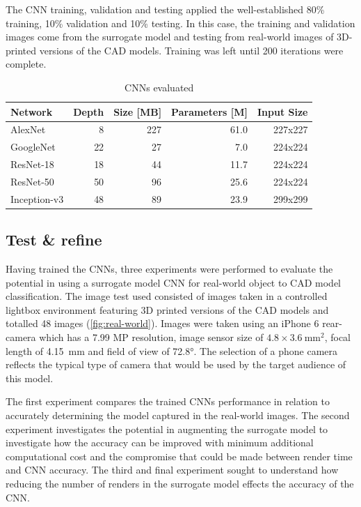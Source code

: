 \documentclass[a4paper, 11pt]{article}
\begin{document}
The CNN training, validation and testing applied the well-established 80\% training, 10\% validation and 10\% testing.
In this case, the training and validation images come from the surrogate model and testing from real-world images of 3D-printed versions of the CAD models.
Training was left until 200 iterations were complete.

\begin{table}
    \centering
    \caption{CNNs evaluated}\small
    \begin{tabular}{l r r r r}
    \toprule
        Network & Depth & Size [MB] & Parameters [M] & Input Size \\
    \midrule
        AlexNet \parencite{alexnet} & 8 & 227 & 61.0 & 227x227 \\
        GoogleNet \parencite{googlenet} & 22 & 27 & 7.0 & 224x224 \\
        ResNet-18 \parencite{resnet} & 18 & 44 & 11.7 & 224x224 \\
        ResNet-50 \parencite{resnet} & 50 & 96 & 25.6 & 224x224 \\
        Inception-v3 \parencite{inception} & 48 & 89 & 23.9 & 299x299 \\
    \bottomrule
    \end{tabular}
\end{table}


\subsection{Test \& refine}\label{sec:test}

Having trained the CNNs, three experiments were performed to evaluate the potential in using a surrogate model CNN for real-world object to CAD model classification. The image test used consisted of images taken in a controlled lightbox environment featuring 3D printed versions of the CAD models and totalled 48 images (\cref{fig:real-world}). Images were taken using an iPhone 6 rear-camera which has a 7.99 MP resolution, image sensor size of $4.8 \times \SI{3.6}{\milli\metre^2}$, focal length of \SI{4.15}{\milli\metre} and field of view of \ang{72.8}. The selection of a phone camera reflects the typical type of camera that would be used by the target audience of this model.

The first experiment compares the trained CNNs performance in relation to accurately determining the model captured in the real-world images. The second experiment investigates the potential in augmenting the surrogate model to investigate how the accuracy can be improved with minimum additional computational cost and the compromise that could be made between render time and CNN accuracy. The third and final experiment sought to understand how reducing the number of renders in the surrogate model effects the accuracy of the CNN.
\end{document}

